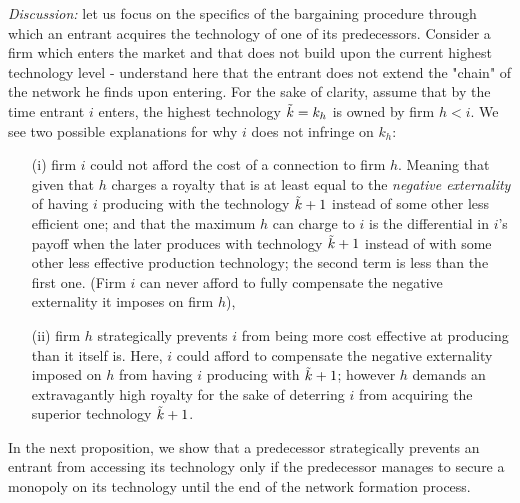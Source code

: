 \documentclass{article}
\begin{document}
\indent \textit{Discussion:} let us focus on the specifics of the bargaining procedure through which an entrant acquires the technology of one of its predecessors. Consider a firm which enters the market and that does not build upon the current highest technology level - understand here that the entrant does not extend the "chain" of the network he finds upon entering. For the sake of clarity, assume that by the time entrant $i$ enters, the highest technology $\Tilde{k}=k_h$ is owned by firm $h<i$. We see two possible explanations for why $i$ does not infringe on $k_h$: 
\begin{enumerate}
    \item[(i)] firm $i$ could not afford the cost of a connection to firm $h$. Meaning that given that $h$ charges a royalty that is at least equal to the \textit{negative externality} of having $i$ producing with the technology $\Tilde{k}+1$ instead of some other less efficient one; and that the maximum $h$ can charge to $i$ is the differential in $i$'s payoff when the later produces with technology $\Tilde{k}+1$ instead of with some other less effective production technology; the second term is less than the first one. (Firm $i$ can never afford to fully compensate the negative externality it imposes on firm $h$),
    \item[(ii)] firm $h$ strategically prevents $i$ from being more cost effective at producing than it itself is. Here, $i$ could afford to compensate the negative externality imposed on $h$ from having $i$ producing with $\Tilde{k}+1$; however $h$ demands an extravagantly high royalty for the sake of deterring $i$ from acquiring the superior technology $\Tilde{k}+1$. 
\end{enumerate}

\indent In the next proposition, we show that a predecessor strategically prevents an entrant from accessing its technology only if the predecessor manages to secure a monopoly on its technology until the end of the network formation process. 
\end{document}

